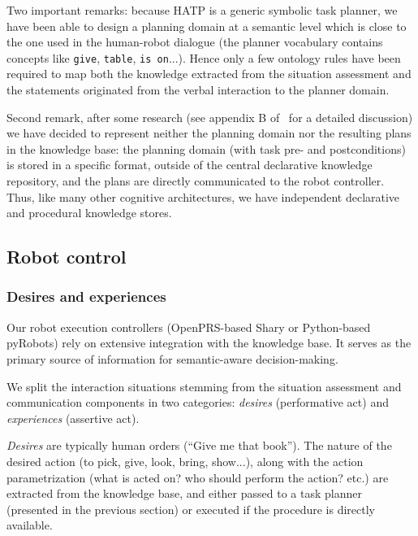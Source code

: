 \documentclass[preprint,3p,times]{elsarticle}
\begin{document}
Two important remarks: because HATP is a generic symbolic task planner, we have
been able to design a planning domain at a semantic level which is close to the
one used in the human-robot dialogue (the planner vocabulary contains concepts
like \texttt{give}, \texttt{table}, \texttt{is on}...). Hence only a few
ontology rules have been required to map both the knowledge extracted from the
situation assessment and the statements originated from the verbal interaction
to the planner domain.

Second remark, after some research (see appendix B of~\cite{Lemaignan2012a} for
a detailed discussion)  we have decided to represent neither the planning
domain nor the resulting plans in the knowledge base: the planning domain (with
task pre- and postconditions) is stored in a specific format, outside of the
central declarative knowledge repository, and the plans are directly
communicated to the robot controller. Thus, like many other cognitive
architectures, we have independent declarative and procedural knowledge stores.


\subsection{Robot control}
\label{sect|ctrl}

\subsubsection{Desires and experiences}

Our robot execution controllers (OpenPRS-based {\sc Shary} or Python-based {\sc
pyRobots}) rely on extensive integration with the knowledge base. It serves as the
primary source of information for semantic-aware decision-making.

We split the interaction situations stemming from the situation assessment and
communication components in two categories: \emph{desires} (performative act)
and \emph{experiences} (assertive act).

\emph{Desires} are typically human orders (``Give me that book''). The nature
of the desired action (to pick, give, look, bring, show...), along with the
action parametrization (what is acted on? who should perform the action? etc.)
are extracted from the knowledge base, and either passed to a task planner
(presented in the previous section) or executed if the procedure is directly
available.
\end{document}
